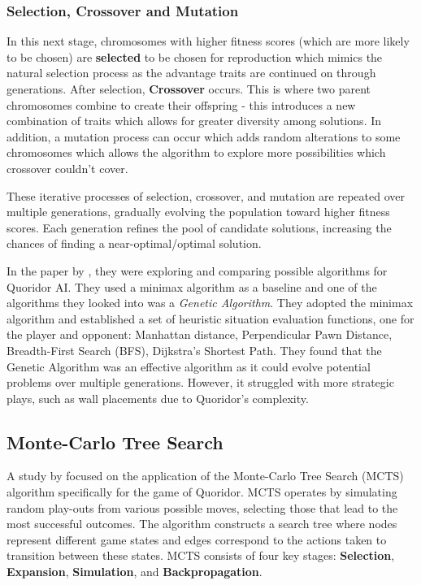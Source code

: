 \documentclass[review]{cmpreport}
\begin{document}
\subsubsection{Selection, Crossover and Mutation}
In this next stage, chromosomes with higher fitness scores (which are more likely to be chosen) are \textbf{selected} to be chosen for reproduction which mimics the natural selection process as the advantage traits are continued on through generations. After selection, \textbf{Crossover} occurs. This is where two parent chromosomes combine to create their offspring - this introduces a new combination of traits which allows for greater diversity among solutions. In addition, a mutation process can occur which adds random alterations to some chromosomes which allows the algorithm to explore more possibilities which crossover couldn't cover. 
\newline

\noindent These iterative processes of selection, crossover, and mutation are repeated over multiple generations, gradually evolving the population toward higher fitness scores. Each generation refines the pool of candidate solutions, increasing the chances of finding a near-optimal/optimal solution.

\noindent In the paper by \cite{josequoridor}, they were exploring and comparing possible algorithms for Quoridor AI. They used a minimax algorithm as a baseline and one of the algorithms they looked into was a \textit{Genetic Algorithm}.
They adopted the minimax algorithm and established a set of heuristic situation evaluation functions, one for the player and opponent: Manhattan distance, Perpendicular Pawn Distance, Breadth-First Search (BFS), Dijkstra's Shortest Path. They found that the Genetic Algorithm was an effective algorithm as it could evolve potential problems over multiple generations. However, it struggled with more strategic plays, such as wall placements due to Quoridor's complexity.

\subsection{Monte-Carlo Tree Search}
A study by \cite{respall2018monte} focused on the application of the Monte-Carlo Tree Search (MCTS) algorithm specifically for the game of Quoridor. MCTS operates by simulating random play-outs from various possible moves, selecting those that lead to the most successful outcomes. The algorithm constructs a search tree where nodes represent different game states and edges correspond to the actions taken to transition between these states. MCTS consists of four key stages: \textbf{Selection}, \textbf{Expansion}, \textbf{Simulation}, and \textbf{Backpropagation}.
\newline
\end{document}

